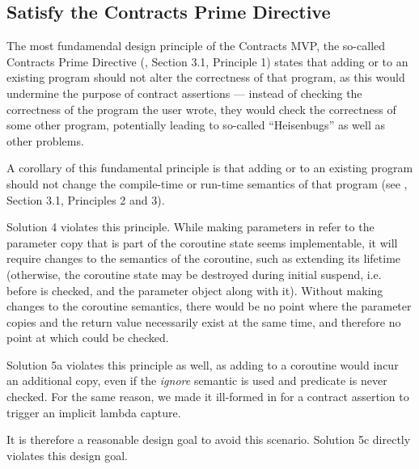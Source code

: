 \subsection{Satisfy the Contracts Prime Directive}

The most fundamendal design principle of the Contracts MVP, the so-called Contracts Prime Directive (\cite{P2900R8}, Section 3.1, Principle 1) states that adding  or  to an existing program should not alter the correctness of that program, as this would undermine the purpose of contract assertions --- instead of checking the correctness of the program the user wrote, they would check the correctness of some other program, potentially leading to so-called ``Heisenbugs'' as well as other problems.

A corollary of this fundamental principle is that adding  or  to an existing program should not change the compile-time or run-time semantics of that program (see \cite{P2900R8}, Section 3.1, Principles 2 and 3).

Solution 4 violates this principle. While making parameters in  refer to the parameter copy that is part of the coroutine state seems implementable, it will require changes to the semantics of the coroutine, such as extending its lifetime (otherwise, the coroutine state may be destroyed during initial suspend, i.e. before  is checked, and the parameter object along with it). Without making changes to the coroutine semantics, there would be no point where the parameter copies and the return value necessarily exist at the same time, and therefore no point at which  could be checked.

Solution 5a violates this principle as well, as adding  to a coroutine would incur an additional copy, even if the \emph{ignore} semantic is used and predicate is never checked. For the same reason, we made it ill-formed in \cite{P2900R8} for a contract assertion to trigger an implicit lambda capture.

It is therefore a reasonable design goal to avoid this scenario. Solution 5c directly violates this design goal.

